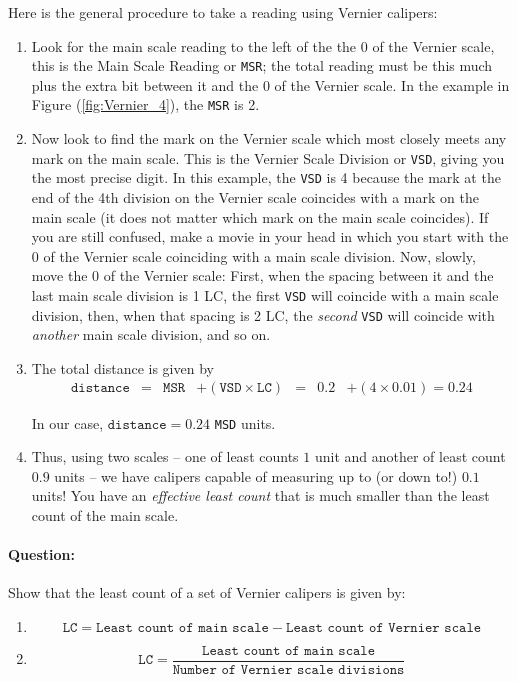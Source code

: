 Here is the general procedure to take a reading using Vernier calipers:

\begin{enumerate}
    \item Look for the main scale reading to the left of the the $0$ of the Vernier scale, this is the Main Scale Reading or \texttt{MSR}; the total reading must be this much plus the extra bit between it and the 0 of the Vernier scale. In the example in Figure (\ref{fig:Vernier_4}), the \texttt{MSR} is 2.
    
    \item Now look to find the mark on the Vernier scale which most closely meets any mark on the main scale. This is the Vernier Scale Division or \texttt{VSD}, giving you the most precise digit. In this example, the \texttt{VSD} is 4 because the mark at the end of the 4th division on the Vernier scale coincides with a mark on the main scale (it does not matter which mark on the main scale coincides). If you are still confused, make a movie in your head in which you start with the 0 of the Vernier scale coinciding with a main scale division. Now, slowly, move the 0 of the Vernier scale: First, when the spacing between it and the last main scale division is 1 LC, the first \texttt{VSD} will coincide with a main scale division, then, when that spacing is 2 LC, the \textit{second} \texttt{VSD} will coincide with \textit{another} main scale division, and so on.
    
    
    \item The total distance is given by 
    \begin{equation*}
    \begin{aligned}
    \texttt{distance} &=& \texttt{MSR} &+ (\texttt{VSD}\times\texttt{LC})
    &=&0.2 &+ (4 \times 0.01) = 0.24
    \end{aligned}
    \end{equation*}
    
    In our case, $\texttt{distance} = 0.24$ \texttt{MSD} units.
    
    \item Thus, using two scales -- one of least counts $1$ unit and another of least count $0.9$ units -- we have calipers capable of measuring up to (or down to!) $0.1$ units! You have an \textit{effective least count} that is much smaller than the least count of the main scale. 
\end{enumerate}

\begin{question}
\paragraph{Question:} Show that the least count of a set of Vernier calipers is given by:
\begin{enumerate}
    \item $$\texttt{LC} = \texttt{Least count of main scale} - \texttt{Least count of Vernier scale}$$
    \item $$\texttt{LC} = \frac{\texttt{Least count of main scale}}{\texttt{Number of Vernier scale divisions}}$$
\end{enumerate}
\end{question}

